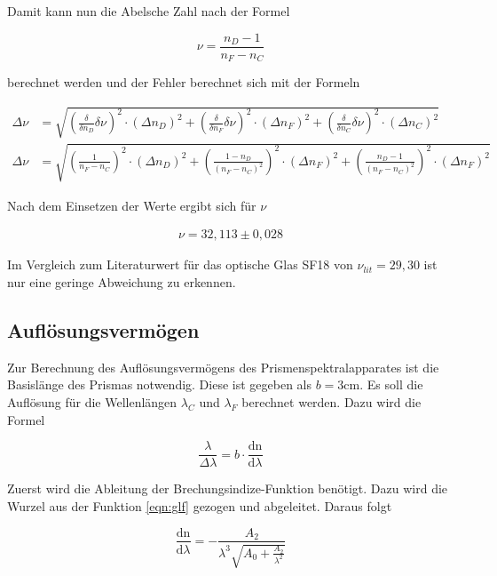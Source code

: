Damit kann nun die Abelsche Zahl nach der Formel 

\begin{equation}
  \nu = \frac{n_D-1}{n_F-n_C}
  \label{eqn:abel}
\end{equation}

berechnet werden und der Fehler berechnet sich mit der Formeln

\begin{align*}
  \Delta \nu &= \sqrt{\left(\frac{\delta}{\delta n_D}\delta \nu \right)^2 \cdot \left(\Delta n_D\right)^2 + \left(\frac{\delta}{\delta n_F}\delta \nu \right)^2 \cdot \left(\Delta n_F\right)^2+\left(\frac{\delta}{\delta n_C}\delta \nu \right)^2 \cdot \left(\Delta n_C\right)^2} \\
  \Delta \nu &= \sqrt{\left(\frac{1}{n_F - n_C}\right)^2\cdot \left(\Delta n_D\right)^2 + \left(\frac{1-n_D}{\left(n_F-n_C\right)^2}\right)^2\cdot \left(\Delta n_F\right)^2 + \left(\frac{n_D - 1}{\left(n_F-n_C\right)^2}\right)^2\cdot \left(\Delta n_F\right)^2}
\end{align*}

Nach dem Einsetzen der Werte ergibt sich für $\nu$

\begin{align*}
  \nu = 32,113 \pm 0,028
\end{align*}

Im Vergleich zum Literaturwert für das optische Glas SF18 von $\nu_{lit} = 29,30$ \cite{ref2} ist nur eine geringe Abweichung zu erkennen.

\subsection{Auflösungsvermögen}

Zur Berechnung des Auflösungsvermögens des Prismenspektralapparates  ist die Basislänge des Prismas notwendig.
Diese ist gegeben als $b = 3$cm.
Es soll die Auflösung für die Wellenlängen $\lambda_C$ und $\lambda_F$ berechnet werden.
Dazu wird die Formel

\begin{equation}
  \frac{\lambda}{\Delta \lambda} = b \cdot \frac{\text{dn}}{\text{d}\lambda}
  \label{eqn:aufl}
\end{equation}

Zuerst wird die Ableitung der Brechungsindize-Funktion benötigt.
Dazu wird die Wurzel aus der Funktion \ref{eqn:glf} gezogen und abgeleitet.
Daraus folgt

\begin{equation}
  \frac{\text{dn}}{\text{d}\lambda} = - \frac{A_2}{\lambda^3 \sqrt{A_0 + \frac{A_2}{\lambda^2}}}
  \label{eqn:ableitung}
\end{equation}

